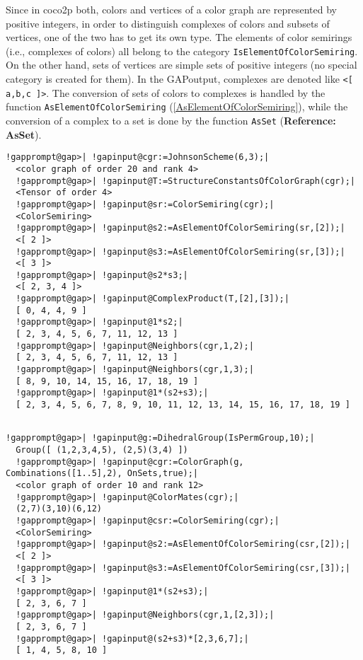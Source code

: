\documentclass[a4paper,11pt]{report}
\begin{document}
{{ Since in \textsf{coco2p} both, colors and vertices of a color graph are represented by positive
integers, in order to distinguish complexes of colors and subsets of vertices,
one of the two has to get its own type. The elements of color semirings (i.e.,
complexes of colors) all belong to the category \texttt{IsElementOfColorSemiring}. On the other hand, sets of vertices are simple sets of positive integers (no
special category is created for them). In the \textsf{GAP}\texttt{}output, complexes are denoted like \texttt{{\textless}[ a,b,c ]{\textgreater}}. The conversion of sets of colors to complexes is handled by the function \texttt{AsElementOfColorSemiring} (\ref{AsElementOfColorSemiring}), while the conversion of a complex to a set is done by the function \texttt{AsSet} (\textbf{Reference: AsSet}). 
\begin{Verbatim}[commandchars=!@|,fontsize=\small,frame=single,label=Example]
  !gapprompt@gap>| !gapinput@cgr:=JohnsonScheme(6,3);|
  <color graph of order 20 and rank 4>
  !gapprompt@gap>| !gapinput@T:=StructureConstantsOfColorGraph(cgr);|
  <Tensor of order 4>
  !gapprompt@gap>| !gapinput@sr:=ColorSemiring(cgr);|
  <ColorSemiring>
  !gapprompt@gap>| !gapinput@s2:=AsElementOfColorSemiring(sr,[2]);|
  <[ 2 ]>
  !gapprompt@gap>| !gapinput@s3:=AsElementOfColorSemiring(sr,[3]);|
  <[ 3 ]>
  !gapprompt@gap>| !gapinput@s2*s3;|
  <[ 2, 3, 4 ]>
  !gapprompt@gap>| !gapinput@ComplexProduct(T,[2],[3]);|
  [ 0, 4, 4, 9 ]
  !gapprompt@gap>| !gapinput@1*s2;|
  [ 2, 3, 4, 5, 6, 7, 11, 12, 13 ]
  !gapprompt@gap>| !gapinput@Neighbors(cgr,1,2);|
  [ 2, 3, 4, 5, 6, 7, 11, 12, 13 ]
  !gapprompt@gap>| !gapinput@Neighbors(cgr,1,3);|
  [ 8, 9, 10, 14, 15, 16, 17, 18, 19 ]
  !gapprompt@gap>| !gapinput@1*(s2+s3);|
  [ 2, 3, 4, 5, 6, 7, 8, 9, 10, 11, 12, 13, 14, 15, 16, 17, 18, 19 ]
  	
\end{Verbatim}
 
\begin{Verbatim}[commandchars=!@|,fontsize=\small,frame=single,label=Example]
  !gapprompt@gap>| !gapinput@g:=DihedralGroup(IsPermGroup,10);|
  Group([ (1,2,3,4,5), (2,5)(3,4) ])
  !gapprompt@gap>| !gapinput@cgr:=ColorGraph(g, Combinations([1..5],2), OnSets,true);|
  <color graph of order 10 and rank 12>
  !gapprompt@gap>| !gapinput@ColorMates(cgr);|
  (2,7)(3,10)(6,12)
  !gapprompt@gap>| !gapinput@csr:=ColorSemiring(cgr);|
  <ColorSemiring>
  !gapprompt@gap>| !gapinput@s2:=AsElementOfColorSemiring(csr,[2]);|
  <[ 2 ]>
  !gapprompt@gap>| !gapinput@s3:=AsElementOfColorSemiring(csr,[3]);|
  <[ 3 ]>
  !gapprompt@gap>| !gapinput@1*(s2+s3);|
  [ 2, 3, 6, 7 ]
  !gapprompt@gap>| !gapinput@Neighbors(cgr,1,[2,3]);|
  [ 2, 3, 6, 7 ]
  !gapprompt@gap>| !gapinput@(s2+s3)*[2,3,6,7];|
  [ 1, 4, 5, 8, 10 ]
  	

\end{Verbatim}}}
\end{document}
